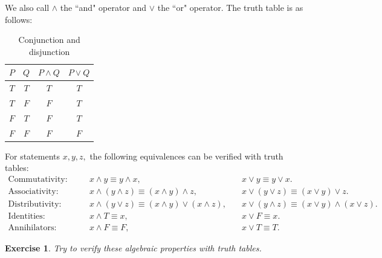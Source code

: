\documentclass{article}[12pt]
\newtheorem{exercise}{Exercise}[section]
\begin{document}
        We also call $\land$ the ``and" operator and $\lor$ the ``or" operator. The truth table is as follows:
        \begin{table}[!ht]
            \centering
            \begin{tabular}{|c|c||c|c|}
                \hline
                     $P$ & $Q$ & $P \land Q$ & $P \lor Q$
                \\ \hline\hline
                     $T$ & $T$ & $T$ & $T$
                \\ \hline
                     $T$ & $F$ & $F$ & $T$
                \\ \hline
                     $F$ & $T$ & $F$ & $T$
                \\ \hline
                     $F$ & $F$ & $F$ & $F$
                \\ \hline
            \end{tabular}
            \caption{Conjunction and disjunction}
            \label{tab:junctions}
        \end{table}
        
        For statements $x, y, z,$ the following equivalences can be verified with truth tables:
        \begin{align}
            \text{Commutativity:}\quad&&
                x \land y
                \equiv
                y \land x,
                \quad&
                x \lor y
                \equiv
                y \lor x.
            \\\text{Associativity:}\quad&&
                x \land (y \land z)
                \equiv
                (x \land y) \land z,
                \quad&
                x \lor (y \lor z)
                \equiv
                (x \lor y) \lor z.
            \\\text{Distributivity:}\quad&&
                x \land (y \lor z)
                \equiv
                (x \land y) \lor (x \land z),
                \quad&
                x \lor (y \land z)
                \equiv
                (x \lor y) \land (x \lor z).
            \\\text{Identities:}\quad&&
                x \land T \equiv x,
                \quad&
                x \lor F \equiv x.
            \\\text{Annihilators:}\quad&&
                x \land F \equiv F,
                \quad&
                x \lor T \equiv T.
        \end{align}
        
        \begin{exercise}
            Try to verify these algebraic properties with truth tables.
        \end{exercise}
        
\end{document}
